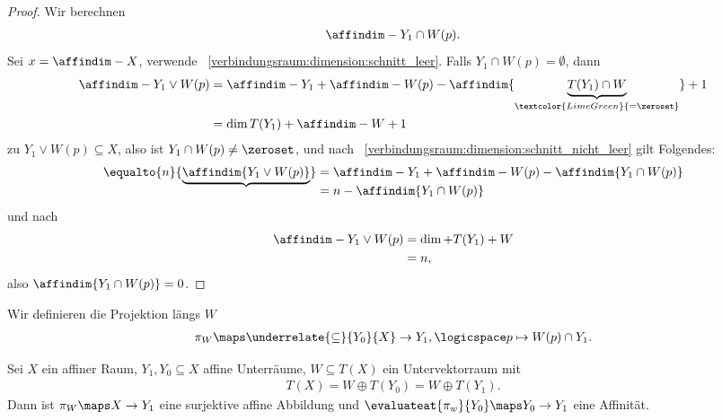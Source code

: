 \begin{proof}
    Wir berechnen
    \begin{align*}
        \affindim-{Y_1\cap W(p)}.
    \end{align*}
    Sei \( x=\affindim-{X} \), verwende ~\ref{verbindungsraum:dimension:schnitt_leer}.
    Falls \( Y_1\cap W(p)=\emptyset \), dann
    \begin{align*}
        \affindim-{Y_1\vee W(p)}\begin{aligned}[t] 
            &=\affindim-{Y_1}+\affindim-{W(p)}-\affindim{\underbrace{T(Y_1)\cap W}_{\textcolor{LimeGreen}{=\zeroset}}}+1\\
            &=\dim{T(Y_1)}+\affindim-{W}+1
        \end{aligned}
    \end{align*}
    \contra zu \( Y_1\vee W(p)\subseteq X \), also ist \( Y_1\cap W(p)\neq \zeroset \), und nach ~\ref{verbindungsraum:dimension:schnitt_nicht_leer} gilt Folgendes:
    \begin{align*}
        \equalto{n}{\underbrace{\affindim{Y_1\vee W(p)}}}\begin{aligned}[t] 
            &=\affindim-{Y_1}+\affindim-{W(p)}-\affindim{Y_1\cap W(p)}\\
            &=n-\affindim{Y_1\cap W(p)}
        \end{aligned}
    \end{align*}
    und nach 
    \begin{align*}
        \affindim-{Y_1\vee W(p)}\begin{aligned}[t] 
            &=\dim+{T(Y_1)+W}\\
            &=n,
        \end{aligned}
    \end{align*}
    also \( \affindim{Y_1\cap W(p)}=0 \).
    
\end{proof}
Wir definieren die Projektion längs \( W \)
\begin{align*}
    \pi_W\maps \underrelate{\subseteq}{Y_0}{X}\to Y_1,\logicspace p\mapsto W(p)\cap Y_1.
\end{align*}
\begin{satz}
    Sei \( X \) ein affiner Raum, \( Y_1,Y_0\subseteq X \) affine Unterräume, \( W\subseteq T(X) \) ein Untervektorraum mit 
    \begin{align*}
        T(X)=W\oplus T(Y_0)=W\oplus T(Y_1).
    \end{align*}
    Dann ist \( \pi_W\maps X\to Y_1 \) eine surjektive affine Abbildung und \( \evaluateat{\pi_w}{Y_0}\maps Y_0\to Y_1 \) eine Affinität.
\end{satz}
